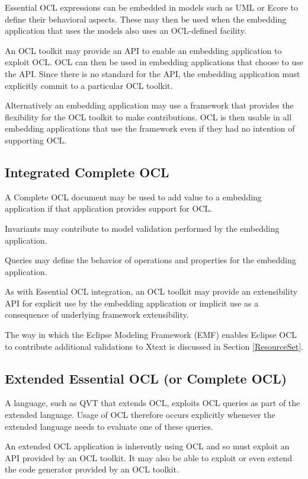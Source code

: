 \documentclass[a4paper]{article}
\begin{document}
Essential OCL expressions can be embedded in models such as UML or Ecore to define their behavioral aspects. These may then be used when the embedding application that uses the models also uses an OCL-defined facility.

An OCL toolkit may provide an API to enable an embedding application to exploit OCL. OCL can then be used in embedding applications that choose to use the API. Since there is no standard for the API, the embedding application must explicitly commit to a particular OCL toolkit.

Alternatively an embedding application may use a framework that provides the flexibility for the OCL toolkit to make contributions. OCL is then usable in all embedding applications that use the framework even if they had no intention of supporting OCL.

\subsection{Integrated Complete OCL}\label{IntegratedCompleteOCL}

A Complete OCL document may be used to add value to a embedding application if that application provides support for OCL.

Invariants may contribute to model validation performed by the embedding application.

Queries may define the behavior of operations and properties for the embedding application.

As with Essential OCL integration, an OCL toolkit may provide an extensibility API for explicit use by the embedding application or implicit use as a consequence of underlying framework extensibility.

The way in which the Eclipse Modeling Framework (EMF)  enables Eclipse OCL to contribute additional validations to Xtext is discussed in Section \ref{ResourceSet}.

\subsection{Extended Essential OCL (or Complete OCL)}\label{ExtendedEssentialOCL}

A language, such as QVT that extends OCL, exploits OCL queries as  part of the extended language. Usage of OCL therefore occurs explicitly whenever the extended language needs to evaluate one of these queries.

An extended OCL application is inherently using OCL and so must exploit an API provided by an OCL toolkit. It may also be able to exploit or even extend the code generator provided by an OCL toolkit.
\end{document}
